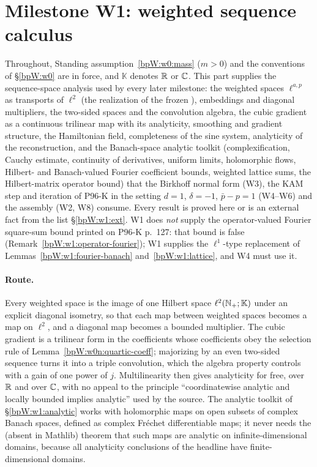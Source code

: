 \section{Milestone W1: weighted sequence calculus}\label{bpW:w1}

Throughout, Standing assumption~\ref{bpW:w0:mass} ($m>0$) and the conventions of \S\ref{bpW:w0} are in force, and
$\mathbb K$ denotes $\mathbb{R}$ or $\mathbb{C}$. This part supplies the sequence-space analysis used by every later milestone:
the weighted spaces $\ell^{a,p}$ as transports of $\ell^2$ (the realization of the frozen ),
embeddings and diagonal multipliers, the two-sided spaces and the convolution algebra, the cubic gradient as a
continuous trilinear map with its analyticity, smoothing and gradient structure, the Hamiltonian field, completeness of
the sine system, analyticity of the reconstruction, and the Banach-space analytic toolkit (complexification, Cauchy
estimate, continuity of derivatives, uniform limits, holomorphic flows, Hilbert- and Banach-valued Fourier coefficient
bounds, weighted lattice sums, the Hilbert-matrix operator bound) that the
Birkhoff normal form (W3), the KAM step and iteration of P96-K in the setting $d=1$, $\delta=-1$, $\bar p-p=1$ (W4--W6)
and the assembly (W2, W8) consume. Every result is proved here or is an external fact from the list
\S\ref{bpW:w1:ext}. W1 does \emph{not} supply the operator-valued Fourier square-sum bound printed on P96-K p.~127:
that bound is false (Remark~\ref{bpW:w1:operator-fourier}); W1 supplies the $\ell^1$-type replacement of
Lemmas~\ref{bpW:w1:fourier-banach} and~\ref{bpW:w1:lattice}, and W4 must use it.

\paragraph{Route.} Every weighted space is the image of one Hilbert space $\ell^2(\mathbb{N}_+;\mathbb K)$ under an explicit
diagonal isometry, so that each map between weighted spaces becomes a map on $\ell^2$, and a diagonal map becomes a
bounded multiplier. The cubic gradient is a trilinear form in the coefficients whose coefficients obey the selection
rule of Lemma~\ref{bpW:w0n:quartic-coeff}; majorizing by an even two-sided sequence turns it into a triple convolution,
which the algebra property controls with a gain of one power of $j$. Multilinearity then gives analyticity for free,
over $\mathbb{R}$ and over $\mathbb{C}$, with no appeal to the principle ``coordinatewise analytic and locally bounded implies
analytic'' used by the source. The analytic toolkit of \S\ref{bpW:w1:analytic} works with holomorphic maps on open
subsets of complex Banach spaces, defined as complex Fr\'echet differentiable maps; it never needs the (absent in
Mathlib) theorem that such maps are analytic on infinite-dimensional domains, because all analyticity conclusions of the
headline have finite-dimensional domains.

